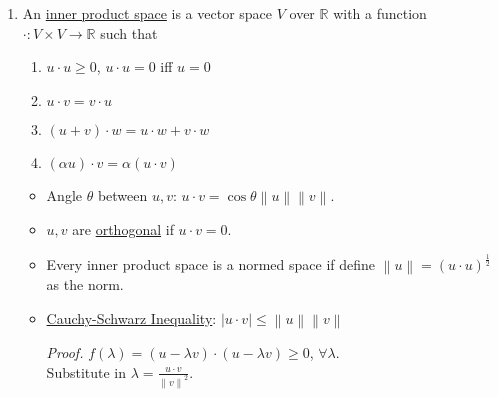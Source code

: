 \documentclass[%
 aip,
 jmp,%
 amsmath,amssymb,
 reprint,%
]{revtex4-1}
\def\R{{\mathbb R}}
\def\a{\alpha}
\def\l{\lambda}
\renewenvironment{proof}{\color{gray}\footnotesize\emph{Proof.}}{}
\newcommand{\norm}[1]{\left\lVert#1\right\rVert}
\newcommand{\defn}[1]{\underline{#1}}
\begin{document}
\begin{enumerate}
\begin{itemize}
            \begin{proof}
              Minkowski's inequality:\\
              $ \left(\sum_{k}^{n}|x_k+y_k|^p\right)^{\frac{1}{p}} \le
                   \left(\sum_{k}^{n}|x_k|^p\right)^{\frac{1}{p}} +
                   \left(\sum_{k}^{n}|y_k|^p\right)^{\frac{1}{p}}
              $
            \end{proof}

        \item If $1 \le p \le q \le \infty$, then $\norm{x}_p \ge \norm{x}_q$.

            \begin{proof}
              Normalize $x$ to $\frac{x}{\norm{x}_p}$ so that $\norm{x}_p=1$.
              Then it is easy to see $\norm{x}_q \le 1$ because for each
              element $|x_i|^q \le |x_i|^p$.
            \end{proof}

      \end{itemize}

    \item An \defn{inner product space} is a vector space $V$ over $\R$ with a
    function $\boldsymbol{\cdot}: V \times V \to \R$ such that
        \begin{enumerate}
          \item $u \cdot u \ge 0$, $u \cdot u = 0$ iff $u=0$
          \item $u \cdot v = v \cdot u$
          \item $(u+v)\cdot w = u \cdot w + v \cdot w$
          \item $(\a u)\cdot v = \a (u\cdot v)$
        \end{enumerate}
        \begin{itemize}
          \item Angle $\theta$ between $u,v$: $u \cdot v=\cos\theta \norm{u}\norm{v}$.
          \item $u,v$ are \defn{orthogonal} if $u \cdot v=0$.
          \item Every inner product space is a normed space if define
          $\norm{u} = (u\cdot u)^{\frac{1}{2}}$ as the norm.
          \item \defn{Cauchy-Schwarz Inequality}: $|u\cdot v| \le \norm{u}\norm{v}$

              \begin{proof}
                $f(\l)=(u-\l v)\cdot (u-\l v) \ge 0$, $\forall\l$.\\
                Substitute in $\l=\frac{u\cdot v}{\norm{v}^2}$.
              \end{proof}

        \end{itemize}
\end{enumerate}
\end{document}
